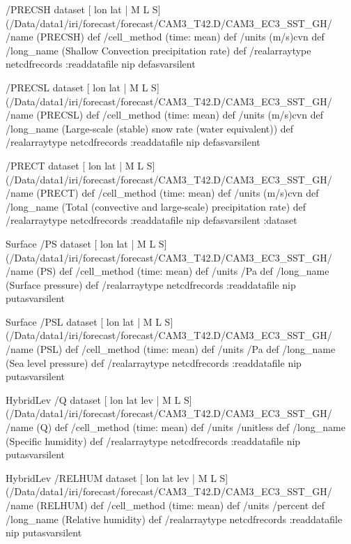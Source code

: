 \begin{ingrid}
/PRECSH{
dataset
[ lon lat | M L S] (/Data/data1/iri/forecast/forecast/CAM3_T42.D/CAM3_EC3_SST_GH/%
/name (PRECSH) def
 /cell_method (time: mean) def
 /units (m/s)cvn def
 /long_name (Shallow Convection precipitation rate) def
 /realarraytype netcdfrecords :readdatafile
nip
}defasvarsilent

/PRECSL{
dataset
[ lon lat | M L S] (/Data/data1/iri/forecast/forecast/CAM3_T42.D/CAM3_EC3_SST_GH/%
/name (PRECSL) def
 /cell_method (time: mean) def
 /units (m/s)cvn def
 /long_name (Large-scale (stable) snow rate (water equivalent)) def
 /realarraytype netcdfrecords :readdatafile
nip
}defasvarsilent

/PRECT{
dataset
[ lon lat | M L S] (/Data/data1/iri/forecast/forecast/CAM3_T42.D/CAM3_EC3_SST_GH/%
/name (PRECT) def
 /cell_method (time: mean) def
 /units (m/s)cvn def
 /long_name (Total (convective and large-scale) precipitation rate) def
 /realarraytype netcdfrecords :readdatafile
nip
}defasvarsilent
:dataset


Surface /PS{
dataset
[ lon lat | M L S] (/Data/data1/iri/forecast/forecast/CAM3_T42.D/CAM3_EC3_SST_GH/%
/name (PS) def
 /cell_method (time: mean) def
 /units /Pa def
 /long_name (Surface pressure) def
 /realarraytype netcdfrecords :readdatafile
nip
}putasvarsilent

Surface /PSL{
dataset
[ lon lat | M L S] (/Data/data1/iri/forecast/forecast/CAM3_T42.D/CAM3_EC3_SST_GH/%
/name (PSL) def
 /cell_method (time: mean) def
 /units /Pa def
 /long_name (Sea level pressure) def
 /realarraytype netcdfrecords :readdatafile
nip
}putasvarsilent


HybridLev /Q{
dataset
[ lon lat lev | M L S] (/Data/data1/iri/forecast/forecast/CAM3_T42.D/CAM3_EC3_SST_GH/%
/name (Q) def
 /cell_method (time: mean) def
 /units /unitless def
 /long_name (Specific humidity) def
 /realarraytype netcdfrecords :readdatafile
nip
}putasvarsilent

HybridLev /RELHUM{
dataset
[ lon lat lev | M L S] (/Data/data1/iri/forecast/forecast/CAM3_T42.D/CAM3_EC3_SST_GH/%
/name (RELHUM) def
 /cell_method (time: mean) def
 /units /percent def
 /long_name (Relative humidity) def
 /realarraytype netcdfrecords :readdatafile
nip
}putasvarsilent



\end{ingrid}

